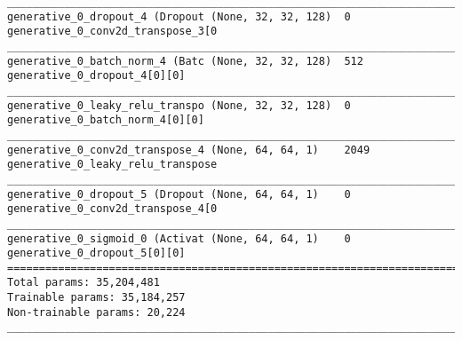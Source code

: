 \begin{lstlisting}[caption={dSprites-VLAE Decoder},captionpos=b,basicstyle=\tiny, label={lst:dsprites-vlae-decoder}]
__________________________________________________________________________________________________
generative_0_dropout_4 (Dropout (None, 32, 32, 128)  0           generative_0_conv2d_transpose_3[0
__________________________________________________________________________________________________
generative_0_batch_norm_4 (Batc (None, 32, 32, 128)  512         generative_0_dropout_4[0][0]
__________________________________________________________________________________________________
generative_0_leaky_relu_transpo (None, 32, 32, 128)  0           generative_0_batch_norm_4[0][0]
__________________________________________________________________________________________________
generative_0_conv2d_transpose_4 (None, 64, 64, 1)    2049        generative_0_leaky_relu_transpose
__________________________________________________________________________________________________
generative_0_dropout_5 (Dropout (None, 64, 64, 1)    0           generative_0_conv2d_transpose_4[0
__________________________________________________________________________________________________
generative_0_sigmoid_0 (Activat (None, 64, 64, 1)    0           generative_0_dropout_5[0][0]
==================================================================================================
Total params: 35,204,481
Trainable params: 35,184,257
Non-trainable params: 20,224
__________________________________________________________________________________________________
\end{lstlisting}